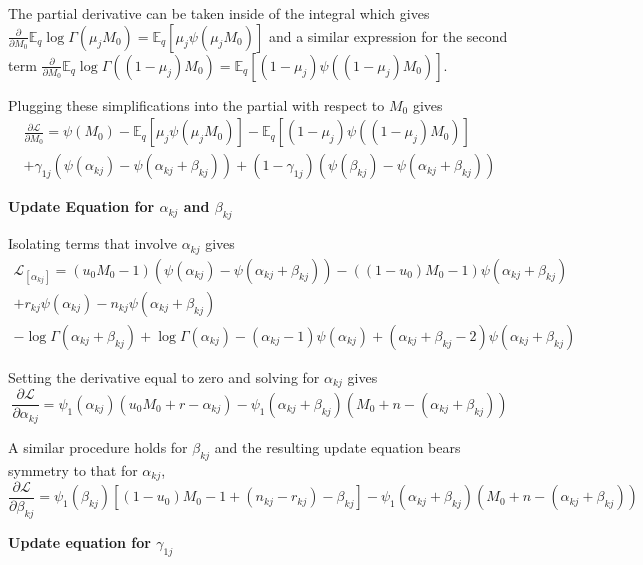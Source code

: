 \documentclass[10pt, letterpaper]{article}
\newcommand{\E}{\mathbb{E}}
\begin{document}
The partial derivative can be taken inside of the integral which gives $\frac{\partial}{\partial M_0}\E_q\log \Gamma(\mu_jM_0) = \E_q \left[ \mu_j \psi(\mu_j M_0) \right]$ and a similar expression for the second term $\frac{\partial}{\partial M_0}\E_q\log \Gamma((1-\mu_j)M_0) = \E_q \left[(1- \mu_j) \psi((1-\mu_j) M_0) \right]$.

Plugging these simplifications into the partial with respect to $M_0$ gives
\begin{multline}
\frac{\partial \mathcal{L}}{\partial M_0} = \psi(M_0) - \E_q \left[ \mu_j \psi(\mu_j M_0) \right]
-\E_q \left[(1- \mu_j) \psi((1-\mu_j) M_0) \right] \\
+\gamma_{1j}(\psi(\alpha_{kj})-\psi(\alpha_{kj}+\beta_{kj})) 
+(1-\gamma_{1j})(\psi(\beta_{kj})-\psi(\alpha_{kj}+\beta_{kj}))
\end{multline}

{\bf Update Equation for $\alpha_{kj}$ and $\beta_{kj}$ }

Isolating terms that involve $\alpha_{kj}$ gives
\begin{multline*}
\mathcal{L}_{[\alpha_{kj}]} = (u_0M_0 -1)(\psi(\alpha_{kj}) - \psi(\alpha_{kj}+\beta_{kj})) -((1-u_0)M_0-1)\psi(\alpha_{kj}+\beta_{kj}) \\
+ r_{kj}\psi(\alpha_{kj})-n_{kj}\psi(\alpha_{kj}+\beta_{kj}) \\
 - \log \Gamma (\alpha_{kj}+\beta_{kj}) + \log \Gamma(\alpha_{kj}) -(\alpha_{kj}-1)\psi(\alpha_{kj})+(\alpha_{kj}+\beta_{kj}-2)\psi(\alpha_{kj}+\beta_{kj})
\end{multline*}

Setting the derivative equal to zero and solving for $\alpha_{kj}$ gives
\begin{equation}
 \frac{\partial \mathcal{L}}{\partial \alpha_{kj}} = \psi_1(\alpha_{kj})(u_0M_0+r-\alpha_{kj}) - \psi_1(\alpha_{kj}+\beta_{kj})(M_0+n-(\alpha_{kj}+\beta_{kj}))
\end{equation}

A similar procedure holds for $\beta_{kj}$ and the resulting update equation bears symmetry to that for $\alpha_{kj}$,
\begin{equation}
 \frac{\partial \mathcal{L}}{\partial \beta_{kj}} = \psi_1(\beta_{kj}) \left[ (1-u_0)M_0-1+(n_{kj}-r_{kj})-\beta_{kj}\right] - \psi_1(\alpha_{kj}+\beta_{kj})(M_0+n-(\alpha_{kj}+\beta_{kj}))
\end{equation}

{\bf Update equation for $\gamma_{1j}$}\label{sec:gamma1_update}
\end{document}
